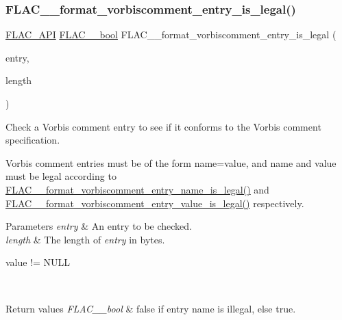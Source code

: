 \subsubsection{\texorpdfstring{F\+L\+A\+C\+\_\+\+\_\+format\+\_\+vorbiscomment\+\_\+entry\+\_\+is\+\_\+legal()}{FLAC\_\_format\_vorbiscomment\_entry\_is\_legal()}}
{\footnotesize\ttfamily \hyperlink{group__flac__export_ga56ca07df8a23310707732b1c0007d6f5}{F\+L\+A\+C\+\_\+\+A\+PI} \hyperlink{ordinals_8h_a95103469f1cbd78b8cf250194985b34e}{F\+L\+A\+C\+\_\+\+\_\+bool} F\+L\+A\+C\+\_\+\+\_\+format\+\_\+vorbiscomment\+\_\+entry\+\_\+is\+\_\+legal (\begin{DoxyParamCaption}\item[{\hyperlink{zconf_8h_a2c212835823e3c54a8ab6d95c652660e}{const} \hyperlink{ordinals_8h_a5eb569b12d5b047cdacada4d57924ee3}{F\+L\+A\+C\+\_\+\+\_\+byte} $\ast$}]{entry,  }\item[{unsigned}]{length }\end{DoxyParamCaption})}

Check a Vorbis comment entry to see if it conforms to the Vorbis comment specification.

Vorbis comment entries must be of the form \textquotesingle{}name=value\textquotesingle{}, and \textquotesingle{}name\textquotesingle{} and \textquotesingle{}value\textquotesingle{} must be legal according to \hyperlink{group__flac__format_ga14980d2e4b0ff2cdd4f22fcf8e75b54c}{F\+L\+A\+C\+\_\+\+\_\+format\+\_\+vorbiscomment\+\_\+entry\+\_\+name\+\_\+is\+\_\+legal()} and \hyperlink{group__flac__format_gae0707c9d46b2af02f1e145bdae331605}{F\+L\+A\+C\+\_\+\+\_\+format\+\_\+vorbiscomment\+\_\+entry\+\_\+value\+\_\+is\+\_\+legal()} respectively.


\begin{DoxyParams}{Parameters}
{\em entry} & An entry to be checked. \\
\hline
{\em length} & The length of {\itshape entry} in bytes.  
\begin{DoxyCode}
value != NULL 
\end{DoxyCode}
 \\
\hline
\end{DoxyParams}

\begin{DoxyRetVals}{Return values}
{\em F\+L\+A\+C\+\_\+\+\_\+bool} & {\ttfamily false} if entry name is illegal, else {\ttfamily true}. \\
\hline
\end{DoxyRetVals}
\mbox{\label{group__flac__format_ga14980d2e4b0ff2cdd4f22fcf8e75b54c}} 
